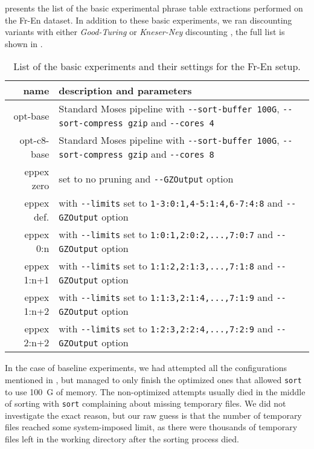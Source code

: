  presents the list of the basic experimental phrase table extractions
performed on the Fr-En dataset.
In addition to these basic experiments, we ran discounting variants with either
\emph{Good-Turing} or \emph{Kneser-Ney} discounting \citep[Chapter 6]{manning:stat-nlp},
the full list is shown in .

\begin{table}[ht]
\centering
\begin{tabular}{ r p{10cm} }
name & description and parameters \\
\hline
\hline
opt-base      & Standard Moses pipeline with \verb|--sort-buffer 100G|, \verb|--sort-compress gzip| and \verb|--cores 4| \\
opt-c8-base   & Standard Moses pipeline with \verb|--sort-buffer 100G|, \verb|--sort-compress gzip| and \verb|--cores 8| \\
eppex zero    & \eppex{} set to no pruning and \verb|--GZOutput| option \\
eppex def.    & \eppex{} with \verb|--limits| set to \verb|1-3:0:1,4-5:1:4,6-7:4:8| and \verb|--GZOutput| option \\
eppex 0:n     & \eppex{} with \verb|--limits| set to \verb|1:0:1,2:0:2,...,7:0:7| and \verb|--GZOutput| option \\
eppex 1:n+1   & \eppex{} with \verb|--limits| set to \verb|1:1:2,2:1:3,...,7:1:8| and \verb|--GZOutput| option \\
eppex 1:n+2   & \eppex{} with \verb|--limits| set to \verb|1:1:3,2:1:4,...,7:1:9| and \verb|--GZOutput| option \\
eppex 2:n+2   & \eppex{} with \verb|--limits| set to \verb|1:2:3,2:2:4,...,7:2:9| and \verb|--GZOutput| option \\
\hline
\hline
\end{tabular}
\caption{\label{fr-en-80-scenarios}
List of the basic experiments and their settings for the Fr-En setup.}
\end{table}

In the case of baseline experiments, we had attempted all the configurations mentioned
in , but managed to only finish the optimized ones
that allowed \texttt{sort} to use 100~G of memory.
The non-optimized attempts usually died in the middle of sorting with \texttt{sort} complaining
about missing temporary files.
We did not investigate the exact reason, but our raw guess is that the number of temporary
files reached some system-imposed limit, as there were thousands of temporary files left in
the working directory after the sorting process died.

